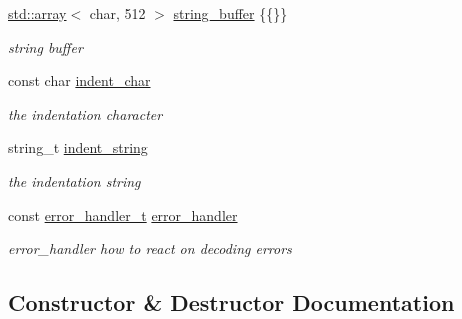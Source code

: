 \begin{DoxyCompactItemize}
\mbox{\label{classnlohmann_1_1detail_1_1serializer_a9c9b7ca63a66e59e5e7ffe8a2acf5c8f}} 
\hyperlink{namespacenlohmann_1_1detail_a1ed8fc6239da25abcaf681d30ace4985af1f713c9e000f5d3f280adbd124df4f5}{std\+::array}$<$ char, 512 $>$ \hyperlink{classnlohmann_1_1detail_1_1serializer_a9c9b7ca63a66e59e5e7ffe8a2acf5c8f}{string\+\_\+buffer} \{\{\}\}
\begin{DoxyCompactList}\small\item\em string buffer \end{DoxyCompactList}\item 
\mbox{\label{classnlohmann_1_1detail_1_1serializer_a9a55e6b028d09676fe35aefa0c72ea5b}} 
const char \hyperlink{classnlohmann_1_1detail_1_1serializer_a9a55e6b028d09676fe35aefa0c72ea5b}{indent\+\_\+char}
\begin{DoxyCompactList}\small\item\em the indentation character \end{DoxyCompactList}\item 
\mbox{\label{classnlohmann_1_1detail_1_1serializer_ae9268a10d88a5526e32735a55a132fc6}} 
string\+\_\+t \hyperlink{classnlohmann_1_1detail_1_1serializer_ae9268a10d88a5526e32735a55a132fc6}{indent\+\_\+string}
\begin{DoxyCompactList}\small\item\em the indentation string \end{DoxyCompactList}\item 
\mbox{\label{classnlohmann_1_1detail_1_1serializer_a09d5a046fb0f7cb61977d6e5fbe8b3a1}} 
const \hyperlink{namespacenlohmann_1_1detail_a5a76b60b26dc8c47256a996d18d967df}{error\+\_\+handler\+\_\+t} \hyperlink{classnlohmann_1_1detail_1_1serializer_a09d5a046fb0f7cb61977d6e5fbe8b3a1}{error\+\_\+handler}
\begin{DoxyCompactList}\small\item\em error\+\_\+handler how to react on decoding errors \end{DoxyCompactList}\end{DoxyCompactItemize}


\subsection{Constructor \& Destructor Documentation}
\mbox{\label{classnlohmann_1_1detail_1_1serializer_ac010525281d97867ee842da37294fe83}} 
